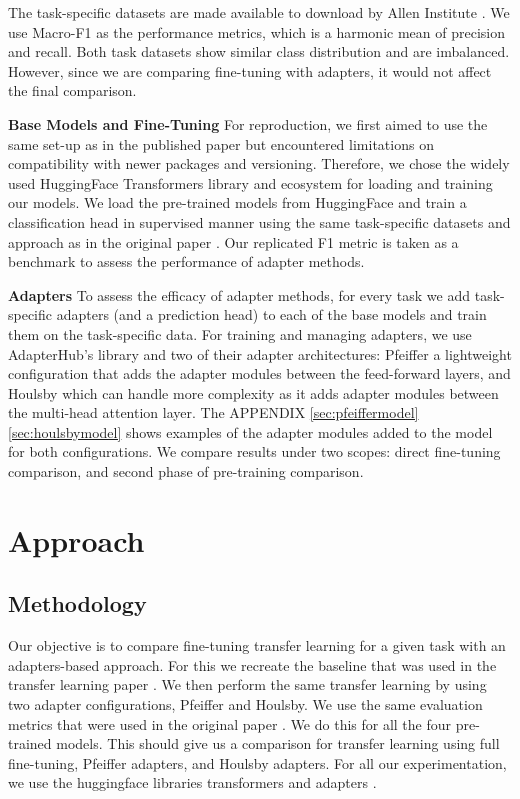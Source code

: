 \documentclass[10pt,twocolumn,letterpaper]{article}
\begin{document}
The task-specific datasets are made available to download by Allen Institute \cite{allenai_dont_stop_pretraining}. We use Macro-F1 as the performance metrics, which is a harmonic mean of precision and recall. Both task datasets show similar class distribution and are imbalanced. However, since we are comparing fine-tuning with adapters, it would not affect the final comparison.

\textbf{Base Models and Fine-Tuning} For reproduction, we first aimed to use the same set-up as in the published paper \cite{allenai_dont_stop_pretraining} but encountered limitations on compatibility with newer packages and versioning. Therefore, we chose the widely used HuggingFace Transformers library \cite{transformers} and ecosystem for loading and training our models. We load the pre-trained models from HuggingFace \cite{allenai_dont_stop_pretraining} and train a classification head in supervised manner using the same task-specific datasets and approach as in the original paper \cite{gururangan2020dont}. Our replicated F1 metric is taken as a benchmark to assess the performance of adapter methods.

\textbf{Adapters}  To assess the efficacy of adapter methods, for every task we add task-specific adapters (and a prediction head) to each of the base models and train them on the task-specific data. For training and managing adapters, we use AdapterHub’s library \cite{adapterhub_overview} and two of their adapter architectures: Pfeiffer \cite{pfeiffer2020adapterhub} a lightweight configuration that adds the adapter modules between the feed-forward layers, and Houlsby \cite{houlsby2019parameter} which can handle more complexity as it adds adapter modules between the multi-head attention layer. The APPENDIX \ref{sec:pfeiffermodel} \ref{sec:houlsbymodel} shows examples of the adapter modules added to the model for both configurations. We compare results under two scopes: direct fine-tuning comparison, and second phase of pre-training comparison.


\section{Approach}

\subsection{Methodology} Our objective is to compare fine-tuning transfer learning for a given task with an adapters-based approach. For this we recreate the baseline that was used in the transfer learning paper \cite{gururangan2020dont}. We then perform the same transfer learning by using two adapter configurations, Pfeiffer and Houlsby. We use the same evaluation metrics that were used in the original paper \cite{gururangan2020dont}. We do this for all the four pre-trained models. This should give us a comparison for transfer learning using full fine-tuning, Pfeiffer adapters, and Houlsby adapters. For all our experimentation, we use the huggingface libraries transformers \cite{transformers} and adapters \cite{adapters}.
\end{document}

